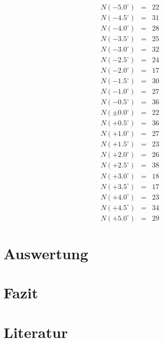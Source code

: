 \documentclass[12pt,a4paper]{scrartcl}
\numberwithin{equation}{section} %
\renewcommand{\[}{} %
\renewcommand{\]}{\noindent} %
\begin{document}
\[
\begin{eqnarray*}
    N(-5.0^\circ) &=& 22 \\
    N(-4.5^\circ) &=& 31 \\
    N(-4.0^\circ) &=& 28 \\
    N(-3.5^\circ) &=& 25 \\
    N(-3.0^\circ) &=& 32 \\
    N(-2.5^\circ) &=& 24 \\
    N(-2.0^\circ) &=& 17 \\
    N(-1.5^\circ) &=& 30 \\
    N(-1.0^\circ) &=& 27 \\
    N(-0.5^\circ) &=& 36 \\
    N(\pm0.0^\circ) &=& 22 \\
    N(+0.5^\circ) &=& 36 \\
    N(+1.0^\circ) &=& 27 \\
    N(+1.5^\circ) &=& 23 \\
    N(+2.0^\circ) &=& 26 \\
    N(+2.5^\circ) &=& 38 \\
    N(+3.0^\circ) &=& 18 \\
    N(+3.5^\circ) &=& 17 \\
    N(+4.0^\circ) &=& 23 \\
    N(+4.5^\circ) &=& 34 \\
    N(+5.0^\circ) &=& 29
\end{eqnarray*}
\]

\clearpage
\hypertarget{auswertung}{%
\section{Auswertung}\label{auswertung}}

\clearpage
\hypertarget{fazit}{%
\section{Fazit}\label{fazit}}

\clearpage
\hypertarget{literatur}{%
\section{Literatur}\label{literatur}}
\end{document}
